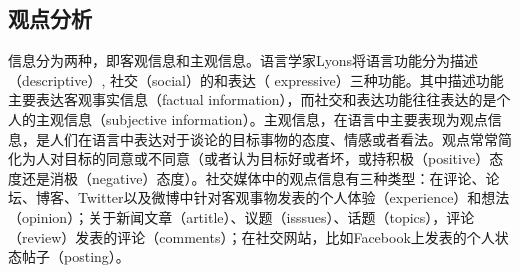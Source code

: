 \subsection{观点分析}


信息分为两种，即客观信息和主观信息。语言学家Lyons将语言功能分为描述（descriptive）, 社交（social）的和表达（ expressive）三种功能。其中描述功能主要表达客观事实信息（factual information），而社交和表达功能往往表达的是个人的主观信息（subjective information）。主观信息，在语言中主要表现为观点信息，是人们在语言中表达对于谈论的目标事物的态度、情感或者看法。观点常常简化为人对目标的同意或不同意（或者认为目标好或者坏，或持积极（positive）态度还是消极（negative）态度）。社交媒体中的观点信息有三种类型：在评论、论坛、博客、Twitter以及微博中针对客观事物发表的个人体验（experience）和想法（opinion）；关于新闻文章（artitle）、议题（isssues）、话题（topics），评论（review）发表的评论（comments）；在社交网站，比如Facebook上发表的个人状态帖子（posting）。


